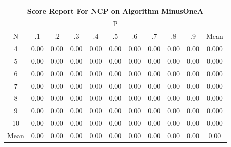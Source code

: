 \documentclass[11pt,a4paper]{report}
\begin{document}
\begin{longtable}{ | c || c | c | c | c | c | c | c | c | c || c |}
\hline
\multicolumn{11}{|c|}{ Score Report For NCP on Algorithm MinusOneA} \\
\hline
\multicolumn{11}{|c|}{ P } \\
\hline
N & .1 & .2 & .3 & .4 & .5 & .6 & .7 & .8 & .9 & Mean\\
 \hline
 \hline
 \endhead
  4 &  \cellcolor[HTML]{FFFFFF} 0.00 &  \cellcolor[HTML]{FFFFFF} 0.00 &  \cellcolor[HTML]{FFFFFF} 0.00 &  \cellcolor[HTML]{FFFFFF} 0.00 &  \cellcolor[HTML]{FFFFFF} 0.00 &  \cellcolor[HTML]{FFFFFF} 0.00 &  \cellcolor[HTML]{FFFFFF} 0.00 &  \cellcolor[HTML]{FFFFFF} 0.00 &  \cellcolor[HTML]{FFFFFF} 0.00 & 0.000 \\
  5 &  \cellcolor[HTML]{FFFFFF} 0.00 &  \cellcolor[HTML]{FFFFFF} 0.00 &  \cellcolor[HTML]{FFFFFF} 0.00 &  \cellcolor[HTML]{FFFFFF} 0.00 &  \cellcolor[HTML]{FFFFFF} 0.00 &  \cellcolor[HTML]{FFFFFF} 0.00 &  \cellcolor[HTML]{FFFFFF} 0.00 &  \cellcolor[HTML]{FFFFFF} 0.00 &  \cellcolor[HTML]{FFFFFF} 0.00 & 0.000 \\
  6 &  \cellcolor[HTML]{FFFFFF} 0.00 &  \cellcolor[HTML]{FFFFFF} 0.00 &  \cellcolor[HTML]{FFFFFF} 0.00 &  \cellcolor[HTML]{FFFFFF} 0.00 &  \cellcolor[HTML]{FFFFFF} 0.00 &  \cellcolor[HTML]{FFFFFF} 0.00 &  \cellcolor[HTML]{FFFFFF} 0.00 &  \cellcolor[HTML]{FFFFFF} 0.00 &  \cellcolor[HTML]{FFFFFF} 0.00 & 0.000 \\
  7 &  \cellcolor[HTML]{FFFFFF} 0.00 &  \cellcolor[HTML]{FFFFFF} 0.00 &  \cellcolor[HTML]{FFFFFF} 0.00 &  \cellcolor[HTML]{FFFFFF} 0.00 &  \cellcolor[HTML]{FFFFFF} 0.00 &  \cellcolor[HTML]{FFFFFF} 0.00 &  \cellcolor[HTML]{FFFFFF} 0.00 &  \cellcolor[HTML]{FFFFFF} 0.00 &  \cellcolor[HTML]{FFFFFF} 0.00 & 0.000 \\
  8 &  \cellcolor[HTML]{FFFFFF} 0.00 &  \cellcolor[HTML]{FFFFFF} 0.00 &  \cellcolor[HTML]{FFFFFF} 0.00 &  \cellcolor[HTML]{FFFFFF} 0.00 &  \cellcolor[HTML]{FFFFFF} 0.00 &  \cellcolor[HTML]{FFFFFF} 0.00 &  \cellcolor[HTML]{FFFFFF} 0.00 &  \cellcolor[HTML]{FFFFFF} 0.00 &  \cellcolor[HTML]{FFFFFF} 0.00 & 0.000 \\
  9 &  \cellcolor[HTML]{FFFFFF} 0.00 &  \cellcolor[HTML]{FFFFFF} 0.00 &  \cellcolor[HTML]{FFFFFF} 0.00 &  \cellcolor[HTML]{FFFFFF} 0.00 &  \cellcolor[HTML]{FFFFFF} 0.00 &  \cellcolor[HTML]{FFFFFF} 0.00 &  \cellcolor[HTML]{FFFFFF} 0.00 &  \cellcolor[HTML]{FFFFFF} 0.00 &  \cellcolor[HTML]{FFFFFF} 0.00 & 0.000 \\
  10 &  \cellcolor[HTML]{FFFFFF} 0.00 &  \cellcolor[HTML]{FFFFFF} 0.00 &  \cellcolor[HTML]{FFFFFF} 0.00 &  \cellcolor[HTML]{FFFFFF} 0.00 &  \cellcolor[HTML]{FFFFFF} 0.00 &  \cellcolor[HTML]{FFFFFF} 0.00 &  \cellcolor[HTML]{FFFFFF} 0.00 &  \cellcolor[HTML]{FFFFFF} 0.00 &  \cellcolor[HTML]{FFFFFF} 0.00 & 0.000 \\
 \hline
 \hline
Mean &  \cellcolor[HTML]{FFFFFF} 0.00 &  \cellcolor[HTML]{FFFFFF} 0.00 &  \cellcolor[HTML]{FFFFFF} 0.00 &  \cellcolor[HTML]{FFFFFF} 0.00 &  \cellcolor[HTML]{FFFFFF} 0.00 &  \cellcolor[HTML]{FFFFFF} 0.00 &  \cellcolor[HTML]{FFFFFF} 0.00 &  \cellcolor[HTML]{FFFFFF} 0.00 &  \cellcolor[HTML]{FFFFFF} 0.00 &  \cellcolor[HTML]{FFFFFF} 0.00
\end{longtable}
\end{document}
